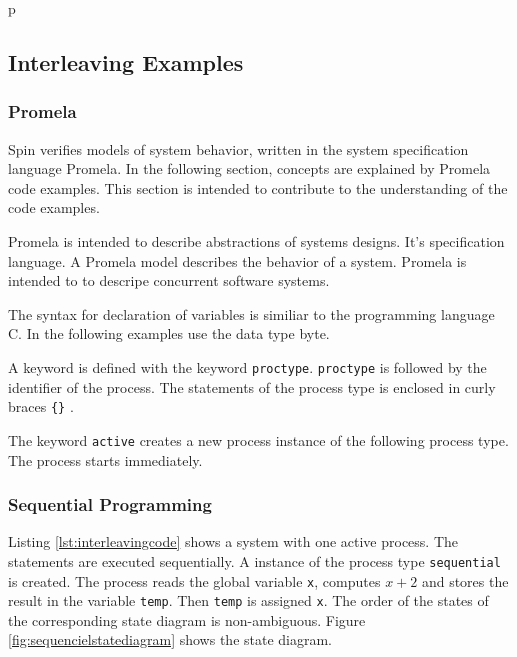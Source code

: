p\documentclass[a4paper, twoside]{article}
\begin{document}
\subsection{Interleaving Examples}
\label{sec:interleavingexamples}

\subsubsection{Promela}
\label{sec:promela}

Spin verifies models of system behavior, written in the system specification language Promela. In the following section, concepts are explained by Promela code examples. This section is intended to contribute to the understanding of the code examples.

Promela is intended to describe abstractions of systems designs. It's specification language. A Promela model describes the behavior of a system. Promela is intended to to descripe concurrent software systems.

The syntax for declaration of variables is similiar to the programming language C. In the following examples use the data type byte.

A keyword is defined with the keyword \verb|proctype|. \verb|proctype| is followed by the identifier of the process. The statements of the process type is enclosed in curly braces \verb|{}| \cite{holzmann03}.

The keyword \verb|active| creates a new process instance of the following process type. The process starts immediately.

\subsubsection{Sequential Programming}
\label{sec:sequential}

Listing \ref{lst:interleavingcode} shows a system with one active process. The statements are executed sequentially. A instance of the process type \verb|sequential| is created. The process reads the global variable \verb|x|, computes $x+2$ and stores the result in the variable \verb|temp|. Then \verb|temp| is assigned \verb|x|. The order of the states of the corresponding state diagram is non-ambiguous. Figure \ref{fig:sequencielstatediagram} shows the state diagram.

   
\end{document}
